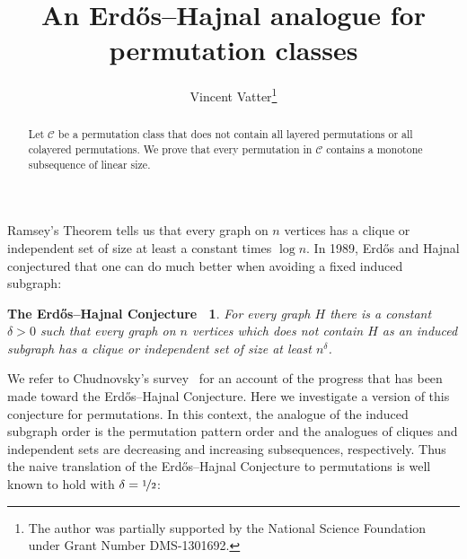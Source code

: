 \documentclass[
final
, nomarks
]{dmtcs-episciences}
\author{Vincent Vatter\affiliationmark{1}\thanks{The author was partially supported by the National Science Foundation under Grant Number DMS-1301692.}}
\title{An Erd\H{o}s--Hajnal analogue for permutation classes}
\affiliation{
  Department of Mathematics, University of Florida, Gainesville, Florida, USA}
\begin{document}
\maketitle
\begin{abstract}
Let $\mathcal{C}$ be a permutation class that does not contain all layered permutations or all colayered permutations. We prove that every permutation in $\mathcal{C}$ contains a monotone subsequence of linear size.
\end{abstract}

%
%
%
%

\newcommand{\Av}{\operatorname{Av}}
\newcommand{\Grid}{\operatorname{Grid}}
\newcommand{\C}{\mathcal{C}}
\newcommand{\D}{\mathcal{D}}
\newcommand{\st}{\::\:}
\newcommand\absdot[2]{
	\node at #1 {\normalsize $\bullet$};
	\node at #1 [below] {$#2$};
}
\newcommand{\plotperm}[1]{
	\foreach \j [count=\i] in {#1} {
		\absdot{(\i,\j)}{};
	};
}
\newcommand{\plotpermbox}[4]{
	\draw [thick, line cap=round]
		({#1-0.5}, {#2-0.5}) rectangle ({#3+0.5}, {#4+0.5});
}

%
%
%
%

\setcounter{footnote}{1}
\renewcommand\thefootnote{\fnsymbol{footnote}}

%
%
%
%

Ramsey's Theorem tells us that every graph on $n$ vertices has a clique or independent set of size at least a constant times $\log n$. In 1989, Erd\H{o}s and Hajnal conjectured that one can do much better when avoiding a fixed induced subgraph:

\newtheorem*{erdos-hajnal-conjecture}{The Erd\H{o}s--Hajnal Conjecture~\cite{erdos:ramsey-type-the:}}
\begin{erdos-hajnal-conjecture}
\emph{For every graph $H$ there is a constant $\delta>0$ such that every graph on $n$ vertices which does not contain $H$ as an induced subgraph has a clique or independent set of size at least $n^\delta$.}
\end{erdos-hajnal-conjecture}

We refer to Chudnovsky's survey~\cite{chudnovsky:the-erdos--hajn:} for an account of the progress that has been made toward the Erd\H{o}s--Hajnal Conjecture. Here we investigate a version of this conjecture for permutations. In this context, the analogue of the induced subgraph order is the permutation pattern order and the analogues of cliques and independent sets are decreasing and increasing subsequences, respectively. Thus the naive translation of the Erd\H{o}s--Hajnal Conjecture to permutations is well known to hold with $\delta=\nicefrac{1}{2}$:
\end{document}
